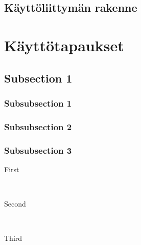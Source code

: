 \documentclass[12pt]{article} %
\begin{document}
\subsection{Käyttöliittymän rakenne} %



\section{Käyttötapaukset} %



\subsection{Subsection 1} %

\subsubsection{Subsubsection 1} %



\subsubsection{Subsubsection 2} %



\subsubsection{Subsubsection 3} %

\begin{description} %

\item[First] \hfill \\

\item[Second] \hfill \\

\item[Third] \hfill \\

\end{description} 
\end{document}
